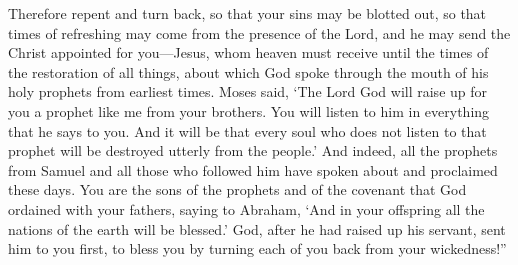 \begin{biblechapter}
\verse Therefore repent and turn back, so that your sins may be blotted out,
\verse so that times of refreshing may come from the presence of the Lord, and he may send the Christ appointed for you—Jesus,
\verse whom heaven must receive until the times of the restoration of all things, about which God spoke through the mouth of his holy prophets from earliest times.
\verse Moses said, ‘The Lord God will raise up for you a prophet like me from your brothers. You will listen to him in everything that he says to you.
\verse And it will be that every soul who does not listen to that prophet will be destroyed utterly from the people.’
\verse And indeed, all the prophets from Samuel and all those who followed him have spoken about and proclaimed these days.
\verse You are the sons of the prophets and of the covenant that God ordained with your fathers, saying to Abraham, ‘And in your offspring all the nations of the earth will be blessed.’
\verse God, after he had raised up his servant, sent him to you first, to bless you by turning each of you back from your wickedness!”
\end{biblechapter}

